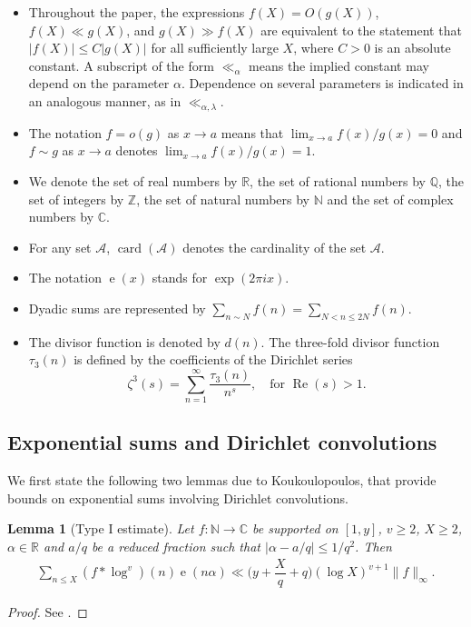 \documentclass[11pt]{amsart}
\numberwithin{equation}{section}
\numberwithin{figure}{section}
\newtheorem{lemma}{Lemma}[section]
\theoremstyle{definition}
\newcommand{\e}{\operatorname{e}}
\begin{document}
\begin{itemize}
    \item Throughout the paper, the expressions $f(X)=O(g(X))$, $f(X) \ll g(X)$, and $g(X) \gg f(X)$ are equivalent to the statement that $|f(X)| \leq C|g(X)|$ for all sufficiently large $X$, where $C>0$ is an absolute constant. A subscript of the form $\ll_{\alpha}$ means the implied constant may depend on the parameter $\alpha$. Dependence on several parameters is indicated in an analogous manner, as in $\ll_{\alpha, \lambda}$.
    \item  The notation $f = o(g)$ as $x\to a$  means
that $\lim_{x\to a} f(x)/g(x) = 0$ and $f\sim g$ as $x\to a$ denotes $\lim_{x\to a} f(x)/g(x)= 1$.
    \item We denote the set of real numbers by $\mathbb{R}$, the set of rational numbers by $\mathbb{Q}$, the set of integers by $\mathbb{Z}$, the set of natural numbers by $\mathbb{N}$ and the set of complex numbers by $\mathbb{C}$.
\item For any set $\mathcal{A}$, $\operatorname{card}(\mathcal{A})$ denotes the cardinality of the set $\mathcal{A}$.
\item The notation $\e(x)$ stands for $\exp(2\pi i x)$.
\item Dyadic sums are represented by $\sum_{n \sim N} f(n) = \sum_{N < n \leqslant 2N} f(n)$.
\item The divisor function is denoted by $d(n)$. The three-fold divisor function $\tau_3(n)$ is defined by the coefficients of the Dirichlet series 
\[\zeta^3(s) = \sum_{n=1}^{\infty}\frac{\tau_3(n)}{n^s}, \quad \textrm{for  } \operatorname{Re}(s) > 1.
\]
\end{itemize}
\subsection{Exponential sums and Dirichlet convolutions}
We first state the following two lemmas due to Koukoulopoulos, that provide bounds on exponential sums involving Dirichlet convolutions.
\begin{lemma}[Type I estimate]\label{lem1}
Let $f\colon \mathbb{N}\to \mathbb{C}$ be supported on $[1, y]$, $v\geqslant 2$, $X\geqslant 2$, $\alpha\in \mathbb{R}$ and $a/q$ be a reduced fraction such that $|\alpha-a/q|\leqslant 1/q^2$. Then
\begin{align*}
\sum_{n\leqslant X}(f*\log^v)(n)\e(n\alpha)\ll \bigg(y + \dfrac{X}{q}+q\bigg)(\log X)^{v+1}\|f\|_{\infty}.
\end{align*}
\end{lemma}
\begin{proof}
See \cite[Theorem 23.5]{K2019}.
\end{proof}
\end{document}

